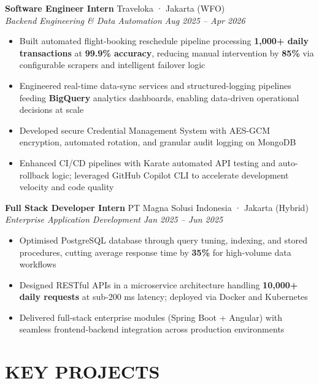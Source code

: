 \documentclass[10pt,a4paper]{article}
\newcommand{\experienceheader}[4]{
    \textbf{#1} \hfill #2 \\
    \textit{#3} \hfill \textit{#4}
}
\begin{document}
\experienceheader{Software Engineer Intern}{Traveloka · Jakarta (WFO)}{Backend Engineering \& Data Automation}{Aug 2025 -- Apr 2026}
\begin{itemize}[leftmargin=*, itemsep=1pt, topsep=1pt]
    \item Built automated flight-booking reschedule pipeline processing \textbf{1,000+ daily transactions} at \textbf{99.9\% accuracy}, reducing manual intervention by \textbf{85\%} via configurable scrapers and intelligent failover logic
    \item Engineered real-time data-sync services and structured-logging pipelines feeding \textbf{BigQuery} analytics dashboards, enabling data-driven operational decisions at scale
    \item Developed secure Credential Management System with AES-GCM encryption, automated rotation, and granular audit logging on MongoDB
    \item Enhanced CI/CD pipelines with Karate automated API testing and auto-rollback logic; leveraged GitHub Copilot CLI to accelerate development velocity and code quality
\end{itemize}

\vspace{2pt}

\experienceheader{Full Stack Developer Intern}{PT Magna Solusi Indonesia · Jakarta (Hybrid)}{Enterprise Application Development}{Jan 2025 -- Jun 2025}
\begin{itemize}[leftmargin=*, itemsep=1pt, topsep=1pt]
    \item Optimised PostgreSQL database through query tuning, indexing, and stored procedures, cutting average response time by \textbf{35\%} for high-volume data workflows
    \item Designed RESTful APIs in a microservice architecture handling \textbf{10,000+ daily requests} at sub-200 ms latency; deployed via Docker and Kubernetes
    \item Delivered full-stack enterprise modules (Spring Boot + Angular) with seamless frontend-backend integration across production environments
\end{itemize}

\vspace{-4pt}

\section*{KEY PROJECTS}
\end{document}

